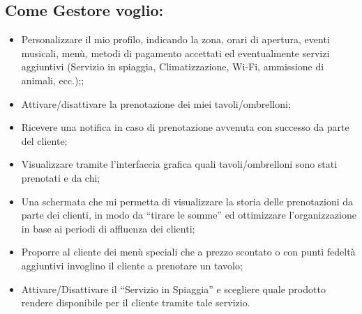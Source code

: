 \documentclass[a4paper]{article}
\begin{document}
\subsection{Come Gestore voglio:}
\begin{itemize}
\item Personalizzare il mio profilo, indicando la zona, orari di apertura, eventi musicali, menù, metodi di pagamento accettati ed eventualmente servizi aggiuntivi (Servizio in spiaggia, Climatizzazione, Wi-Fi, ammissione di animali, ecc.);;
\item Attivare/disattivare la prenotazione dei miei tavoli/ombrelloni;
\item Ricevere una notifica in caso di prenotazione avvenuta con successo da parte del cliente;
\item Visualizzare tramite l'interfaccia grafica quali tavoli/ombrelloni sono stati prenotati e da chi;
\item Una schermata che mi permetta di visualizzare la storia delle prenotazioni da parte dei clienti, in modo da “tirare le somme” ed ottimizzare l'organizzazione in base ai periodi di affluenza dei clienti;
\item Proporre al cliente dei menù speciali che a prezzo scontato o con punti fedeltà aggiuntivi invoglino il cliente a prenotare un tavolo;
\item Attivare/Disattivare il “Servizio in Spiaggia” e scegliere quale prodotto rendere disponibile per il cliente tramite tale servizio.
\end{itemize}
\end{document}
